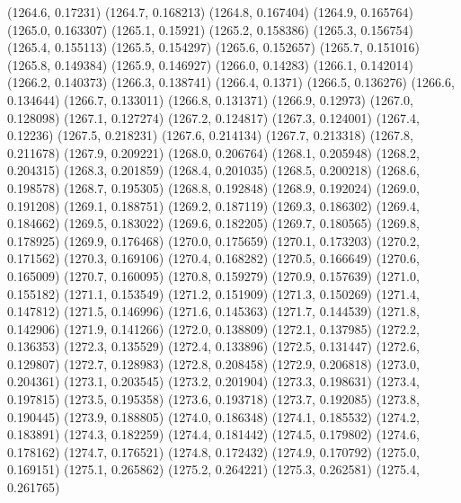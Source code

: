 {					(1264.6, 0.17231)
					(1264.7, 0.168213)
					(1264.8, 0.167404)
					(1264.9, 0.165764)
					(1265.0, 0.163307)
					(1265.1, 0.15921)
					(1265.2, 0.158386)
					(1265.3, 0.156754)
					(1265.4, 0.155113)
					(1265.5, 0.154297)
					(1265.6, 0.152657)
					(1265.7, 0.151016)
					(1265.8, 0.149384)
					(1265.9, 0.146927)
					(1266.0, 0.14283)
					(1266.1, 0.142014)
					(1266.2, 0.140373)
					(1266.3, 0.138741)
					(1266.4, 0.1371)
					(1266.5, 0.136276)
					(1266.6, 0.134644)
					(1266.7, 0.133011)
					(1266.8, 0.131371)
					(1266.9, 0.12973)
					(1267.0, 0.128098)
					(1267.1, 0.127274)
					(1267.2, 0.124817)
					(1267.3, 0.124001)
					(1267.4, 0.12236)
					(1267.5, 0.218231)
					(1267.6, 0.214134)
					(1267.7, 0.213318)
					(1267.8, 0.211678)
					(1267.9, 0.209221)
					(1268.0, 0.206764)
					(1268.1, 0.205948)
					(1268.2, 0.204315)
					(1268.3, 0.201859)
					(1268.4, 0.201035)
					(1268.5, 0.200218)
					(1268.6, 0.198578)
					(1268.7, 0.195305)
					(1268.8, 0.192848)
					(1268.9, 0.192024)
					(1269.0, 0.191208)
					(1269.1, 0.188751)
					(1269.2, 0.187119)
					(1269.3, 0.186302)
					(1269.4, 0.184662)
					(1269.5, 0.183022)
					(1269.6, 0.182205)
					(1269.7, 0.180565)
					(1269.8, 0.178925)
					(1269.9, 0.176468)
					(1270.0, 0.175659)
					(1270.1, 0.173203)
					(1270.2, 0.171562)
					(1270.3, 0.169106)
					(1270.4, 0.168282)
					(1270.5, 0.166649)
					(1270.6, 0.165009)
					(1270.7, 0.160095)
					(1270.8, 0.159279)
					(1270.9, 0.157639)
					(1271.0, 0.155182)
					(1271.1, 0.153549)
					(1271.2, 0.151909)
					(1271.3, 0.150269)
					(1271.4, 0.147812)
					(1271.5, 0.146996)
					(1271.6, 0.145363)
					(1271.7, 0.144539)
					(1271.8, 0.142906)
					(1271.9, 0.141266)
					(1272.0, 0.138809)
					(1272.1, 0.137985)
					(1272.2, 0.136353)
					(1272.3, 0.135529)
					(1272.4, 0.133896)
					(1272.5, 0.131447)
					(1272.6, 0.129807)
					(1272.7, 0.128983)
					(1272.8, 0.208458)
					(1272.9, 0.206818)
					(1273.0, 0.204361)
					(1273.1, 0.203545)
					(1273.2, 0.201904)
					(1273.3, 0.198631)
					(1273.4, 0.197815)
					(1273.5, 0.195358)
					(1273.6, 0.193718)
					(1273.7, 0.192085)
					(1273.8, 0.190445)
					(1273.9, 0.188805)
					(1274.0, 0.186348)
					(1274.1, 0.185532)
					(1274.2, 0.183891)
					(1274.3, 0.182259)
					(1274.4, 0.181442)
					(1274.5, 0.179802)
					(1274.6, 0.178162)
					(1274.7, 0.176521)
					(1274.8, 0.172432)
					(1274.9, 0.170792)
					(1275.0, 0.169151)
					(1275.1, 0.265862)
					(1275.2, 0.264221)
					(1275.3, 0.262581)
					(1275.4, 0.261765)
}
